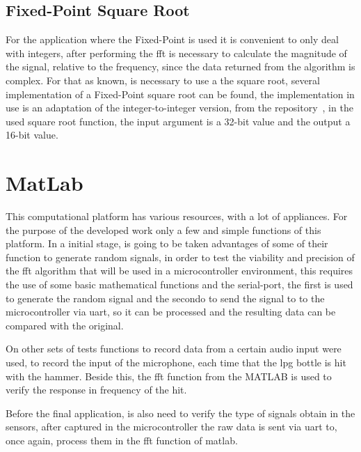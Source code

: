 \subsection{Fixed-Point Square Root}
For the application where the Fixed-Point is used it is convenient to only deal with integers, after performing the \acrshort{fft} is necessary to calculate the magnitude of the signal, relative to the frequency, since the data returned from the algorithm is complex. For that as known, is necessary to use a the square root, several implementation of a Fixed-Point square root can be found, the implementation in use is an adaptation of the integer-to-integer version, from the repository~\cite{ChmikeFpsqrta}, in the used square root function, the input argument is a 32-bit value and the output a 16-bit value.

\section{MatLab}
This computational platform has various resources, with a lot of appliances. For the purpose of the developed work only a few and simple functions of this platform. In a initial stage, is going to be taken advantages of some of their function to generate random signals, in order to test the viability and precision of the \acrshort{fft} algorithm that will be used in a microcontroller environment, this requires the use of some basic mathematical functions and the serial-port, the first is used to generate the random signal and the secondo to send the signal to to the microcontroller via \acrshort{uart}, so it can be processed and the resulting data can be compared with the original. 

On other sets of tests functions to record data from a certain audio input were used, to record the input of the microphone, each time that the \acrshort{lpg} bottle is hit with the hammer. Beside this, the \acrshort{fft} function from the MATLAB is used to verify the response in frequency of the hit.

Before the final application, is also need to verify the type of signals obtain in the sensors, after captured in the microcontroller the raw data is sent via \acrshort{uart} to, once again, process them in the \acrshort{fft} function of \acrshort{matlab}. 
